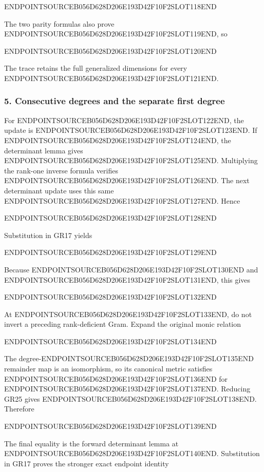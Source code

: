 ENDPOINTSOURCEB056D628D206E193D42F10F2SLOT118END

The two parity formulas also prove ENDPOINTSOURCEB056D628D206E193D42F10F2SLOT119END, so

ENDPOINTSOURCEB056D628D206E193D42F10F2SLOT120END

The trace retains the full generalized dimensions for every ENDPOINTSOURCEB056D628D206E193D42F10F2SLOT121END.

\subsubsection{5. Consecutive degrees and the separate first degree}\label{endpoint-gamma_review--consecutive-degrees-and-the-separate-first-degree}

For ENDPOINTSOURCEB056D628D206E193D42F10F2SLOT122END, the update is ENDPOINTSOURCEB056D628D206E193D42F10F2SLOT123END. If ENDPOINTSOURCEB056D628D206E193D42F10F2SLOT124END, the determinant lemma gives ENDPOINTSOURCEB056D628D206E193D42F10F2SLOT125END. Multiplying the rank-one inverse formula verifies ENDPOINTSOURCEB056D628D206E193D42F10F2SLOT126END. The next determinant update uses this same ENDPOINTSOURCEB056D628D206E193D42F10F2SLOT127END. Hence

ENDPOINTSOURCEB056D628D206E193D42F10F2SLOT128END

Substitution in GR17 yields

ENDPOINTSOURCEB056D628D206E193D42F10F2SLOT129END

Because ENDPOINTSOURCEB056D628D206E193D42F10F2SLOT130END and ENDPOINTSOURCEB056D628D206E193D42F10F2SLOT131END, this gives

ENDPOINTSOURCEB056D628D206E193D42F10F2SLOT132END

At ENDPOINTSOURCEB056D628D206E193D42F10F2SLOT133END, do not invert a preceding rank-deficient Gram. Expand the original monic relation

ENDPOINTSOURCEB056D628D206E193D42F10F2SLOT134END

The degree-ENDPOINTSOURCEB056D628D206E193D42F10F2SLOT135END remainder map is an isomorphism, so its canonical metric satisfies ENDPOINTSOURCEB056D628D206E193D42F10F2SLOT136END for ENDPOINTSOURCEB056D628D206E193D42F10F2SLOT137END. Reducing GR25 gives ENDPOINTSOURCEB056D628D206E193D42F10F2SLOT138END. Therefore

ENDPOINTSOURCEB056D628D206E193D42F10F2SLOT139END

The final equality is the forward determinant lemma at ENDPOINTSOURCEB056D628D206E193D42F10F2SLOT140END. Substitution in GR17 proves the stronger exact endpoint identity

